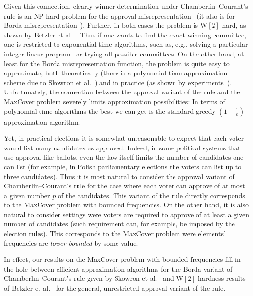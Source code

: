 \documentclass[11pt]{article}
\newcommand{\np}{{\mathrm{NP}}}
\newcommand{\wtwo}{{\mathrm{W[2]}}}
\begin{document}
Given this connection, clearly winner determination under
Chamberlin--Courant's rule is an $\np$-hard problem for the approval
misrepresentation~\cite{complexityProportionalRepr} (it also is for
Borda misrepresentation~\cite{budgetSocialChoice}). Further, in both
cases the problem is $\wtwo$-hard, as shown by Betzler et
al.~\cite{fullyProportionalRepr}.  Thus if one wants to find the exact
winning committee, one is restricted to exponential time algorithms,
such as, e.g., solving a particular integer linear
program~\cite{potthoff-brams} or trying all possible committees.  On
the other hand, at least for the Borda misrepresentation function, the
problem is quite easy to approximate, both theoretically (there is a
polynomial-time approximation scheme due to Skowron et
al.~\cite{sko-fal-sli:c:multiwinner}) and in practice (as shown by
experiments~\cite{sko-fal-sli:c:monroe-cc-experimental}).
Unfortunately, the connection between the approval variant of the rule
and the MaxCover problem severely limits approximation possibilities:
In terms of polynomial-time algorithms the best we can get is the
standard greedy $(1-\frac{1}{e})$-approximation algorithm.


Yet, in practical elections it is somewhat unreasonable to expect that
each voter would list many candidates as approved.  Indeed, in some
political systems that use approval-like ballots, even the law itself
limits the number of candidates one can list (for example, in Polish
parliamentary elections the voters can list up to three
candidates). Thus it is most natural to consider the approval variant
of Chamberlin--Courant's rule for the case where each voter can
approve of at most a given number $p$ of the candidates. This variant
of the rule directly corresponds to the MaxCover problem with bounded
frequencies. On the other hand, it is also natural to consider
settings were voters are required to approve of at least a given
number of candidates (such requirement can, for example, be imposed by
the election rules). This corresponds to the MaxCover problem were
elements' frequencies are \emph{lower bounded} by some value.


In effect, our results on the MaxCover problem with bounded
frequencies fill in the hole between efficient approximation
algorithms for the Borda variant of Chamberlin--Courant's rule given
by Skowron et al.~\cite{sko-fal-sli:c:multiwinner} and
$\wtwo$-hardness results of Betzler et
al.~\cite{fullyProportionalRepr} for the general, unrestricted
approval variant of the rule.
\end{document}
